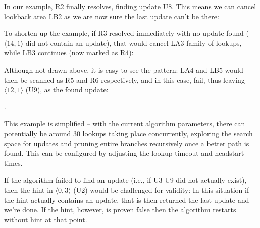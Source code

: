 In our example, R2 finally resolves, finding update U8. This means we can cancel lookback area LB2 as we are now sure the last update can't be there:


To shorten up the example, if R3 resolved immediately with no update found ($\langle  14, 1 \rangle$ did not contain an update), that would cancel LA3 family of lookups, while LB3 continues (now marked as R4):


Although not drawn above, it is easy to see the pattern: LA4 and LB5 would then be scanned as R5 and R6 respectively, and in this case, fail, thus leaving $\langle  12, 1 \rangle$ (U9), as the found update:


.

This example is simplified -- with the current algorithm parameters, there can potentially be around 30 lookups taking place concurrently, exploring the search space for updates and pruning entire branches recursively once a better path is found. This can be configured by adjusting the lookup timeout and headstart times.

If the algorithm failed to find an update (i.e., if U3-U9 did not actually exist), then the hint in $\langle  0, 3 \rangle$ (U2) would be challenged for validity: In this situation if the hint actually contains an update, that is then returned the last update and we're done. If the hint, however, is proven false then the algorithm restarts without hint at that point.


% 


